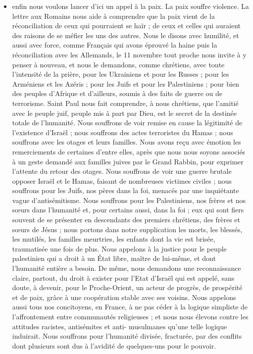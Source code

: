 \begin{itemize}
\item 	enfin nous voulons lancer d’ici un appel à la paix. La paix souffre violence. La lettre aux Romains nous aide à comprendre que la paix vient de la réconciliation de ceux qui pourraient se haïr ; de ceux et celles qui auraient des raisons de se méfier les uns des autres. Nous le disons avec humilité, et aussi avec force, comme Français qui avons éprouvé la haine puis la réconciliation avec les Allemands, le 11 novembre tout proche nous invite à y penser à nouveau, et nous le demandons, comme chrétiens, avec toute l’intensité de la prière, pour les Ukrainiens et pour les Russes ; pour les Arméniens et les Azéris ; pour les Juifs et pour les Palestiniens ; pour bien des peuples d’Afrique et d’ailleurs, soumis à des faits de guerre ou de terrorisme. Saint Paul nous fait comprendre, à nous chrétiens, que l’amitié avec le peuple juif, peuple mis à part par Dieu, est le secret de la destinée totale de l’humanité. Nous souffrons de voir remise en cause la légitimité de l'existence d'Israël ; nous souffrons des actes terroristes du Hamas ; nous souffrons avec les otages et leurs familles. Nous avons reçu avec émotion les remerciements de certaines d'entre elles, après que nous nous soyons associés à un geste demandé aux familles juives par le Grand Rabbin, pour exprimer l’attente du retour des otages. Nous souffrons de voir une guerre brutale opposer Israël et le Hamas, faisant de nombreuses victimes civiles ; nous souffrons pour les Juifs, nos pères dans la foi, menacés par une inquiétante vague d'antisémitisme. Nous souffrons pour les Palestiniens, nos frères et nos sœurs dans l’humanité et, pour certains aussi, dans la foi ; eux qui sont fiers souvent de se présenter en descendants des premiers chrétiens, des frères et sœurs de Jésus ; nous portons dans notre supplication les morts, les blessés, les mutilés, les familles meurtries, les enfants dont la vie est brisée, traumatisée une fois de plus.
Nous appelons à la justice pour le peuple palestinien qui a droit à un État libre, maître de lui-même, et dont l’humanité entière a besoin. De même, nous demandons une reconnaissance claire, partout, du droit à exister pour l’Etat d’Israël qui est appelé, sans doute, à devenir, pour le Proche-Orient, un acteur
de progrès, de prospérité et de paix, grâce à une coopération stable avec ses voisins. Nous appelons aussi tous nos concitoyens, en France, à ne pas céder à la logique simpliste de l’affrontement entre communautés religieuses ; et nous nous élevons contre les attitudes racistes, antisémites et anti- musulmanes qu’une telle logique induirait. Nous souffrons pour l’humanité divisée, fracturée, par des conflits dont plusieurs sont dus à l’avidité de quelques-uns pour le pouvoir.

\end{itemize}
